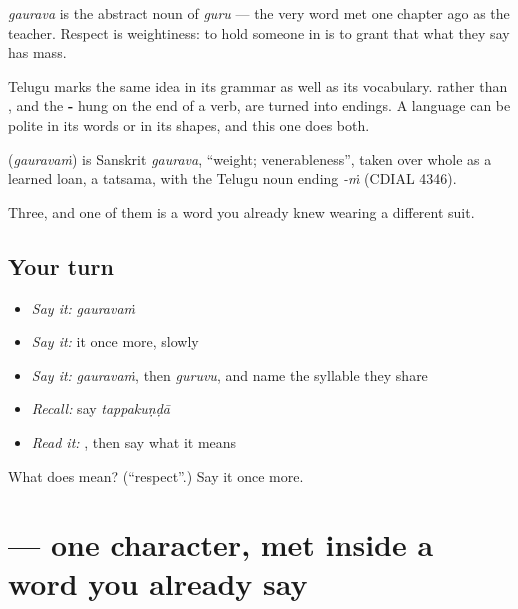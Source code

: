 \emph{gaurava} is the abstract noun of \emph{guru} --- the very word met one chapter ago as the teacher. Respect is weightiness: to hold someone in  is to grant that what they say has mass.

Telugu marks the same idea in its grammar as well as its vocabulary.  rather than , and the \textbf{-} hung on the end of a verb, are  turned into endings. A language can be polite in its words or in its shapes, and this one does both.

\begin{cousinweb}
\textbf{} (\emph{gauravaṁ}) is Sanskrit \emph{gaurava}, \textquotedblleft{}weight; venerableness\textquotedblright{}, taken over whole as a learned loan, a tatsama, with the Telugu noun ending \emph{-ṁ} (CDIAL 4346).
\end{cousinweb}

\begin{grammarlens}[title={What you've built}]
Three, and one of them is a word you already knew wearing a different suit.
\end{grammarlens}

\subsection*{Your turn}
\begin{itemize}
\raggedright
  \item \emph{Say it:} \emph{gauravaṁ}
  \item \emph{Say it:} it once more, slowly
  \item \emph{Say it:} \emph{gauravaṁ}, then \emph{guruvu}, and name the syllable they share
  \item \emph{Recall:} say \emph{tappakuṇḍā}
  \item \emph{Read it:} \textbf{}, then say what it means
\end{itemize}

\begin{tcolorbox}[breakable,colback=teal!4,colframe=teal!35!black,title={Before you move on}]
What does  mean? (\textquotedblleft{}respect\textquotedblright{}.) Say it once more.
\end{tcolorbox}
\section[\texorpdfstring{\te{ౌ} (au)}{ౌ (au)}]{ — one character, met inside a word you already say}

